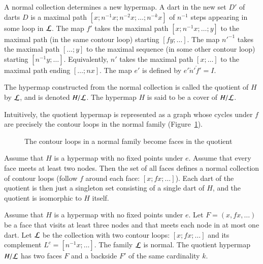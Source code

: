 A normal collection determines a new hypermap.   A dart in the new set $D'$ of darts $D$ is a maximal path $[x;n^{-1} x; n^{-2} x;\ldots;n^{-k} x]$  of $n^{-1}$ steps appearing in some loop in $\cal L$. The map $f'$ takes the maximal path $[x;n^{-1}x;\ldots;y]$ to the maximal path (in the same contour loop) starting $[f y;\ldots]$. The map ${n'}^{-1}$ takes the maximal path  $[\ldots;y]$ to the maximal sequence (in some other contour loop) starting $[n^{-1}y;\ldots]$. Equivalently, $n'$ takes the maximal path $[x;\ldots]$ to the maximal path ending $[\ldots;n x]$. The map $e'$ is defined by $e'\ocirc n'\ocirc f' = I$. 

\begin{definition}[quotient]  The hypermap constructed from the normal collection is called the quotient of $H$ by $\cal L$, and is denoted $H/{\cal L}$.  The hypermap $H$ is said to be a cover of $H/{\cal L}$.
\end{definition}

Intuitively, the quotient hypermap is represented as a graph whose cycles under $f$ are precisely the contour loops in the normal family (Figure~\ref{fig:quot}).


\begin{figure}[htb]
  \centering
  \caption{The contour loops in a normal family become faces in the quotient}
  \label{fig:quot}
\end{figure}


\begin{example}\label{ex:Hall} 
Assume that $H$ is a hypermap with no fixed points under $e$. Assume that every face meets at least two nodes. Then the set of all faces defines a normal collection of contour loops (follow $f$ around each face: $[x;f x;\ldots]$).  Each dart of the quotient is then just a singleton set consisting of a single dart of $H$, and the quotient is isomorphic to $H$ itself.
\end{example}

\begin{example}\label{ex:H2} 
Assume that $H$ is a hypermap with no fixed points
under $e$.  Let $F = (x,f x,\ldots)$ be a face 
that visits at least
three nodes and that meets each node in at most one dart.
Let $\cal L$ be the
collection with two contour loops:  $[x;f x;\ldots]$ and its
complement $L^c = [n^{-1} x;\ldots]$.
The family $\cal L$ is normal. The quotient hypermap $H/{\cal L}$ has two faces $F$ and a backside $F'$ of the same cardinality $k$.
\end{example}





